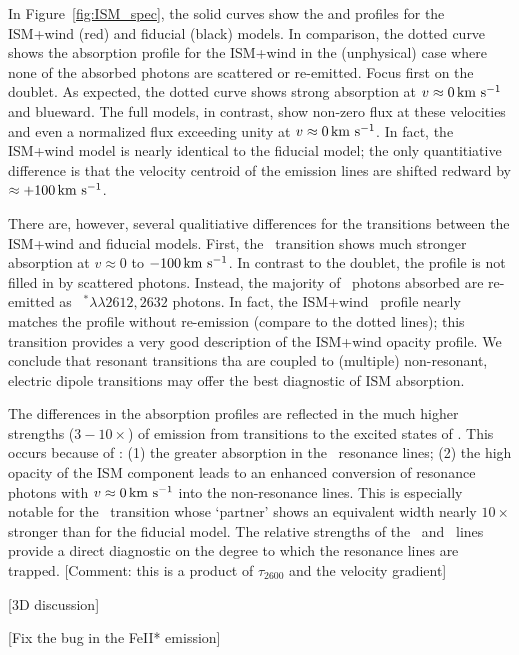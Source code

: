 \documentclass[12pt,preprint]{aastex}
\begin{document}
In Figure~\ref{fig:ISM_spec}, the solid curves show the  and
 profiles for the ISM+wind (red) and fiducial (black)
models. In comparison, the
dotted curve shows the absorption profile for the ISM+wind in the (unphysical) case
where none of the absorbed photons are scattered or re-emitted.   Focus first on the
 doublet.  As expected, the dotted curve shows strong
absorption at $v \approx 0 \, {\rm km~s^{-1}}$ and blueward.  The full models,
in contrast, show non-zero flux at these velocities and even a
normalized flux exceeding unity at $v \approx 0 \, {\rm km~s^{-1}}$.  In
fact, the ISM+wind model is nearly identical to the fiducial model;
the only quantitiative difference is that the velocity centroid of
the emission lines are shifted redward by $\approx +100 \, {\rm km~s^{-1}}$.

There are, however, several qualitiative differences 
for the  transitions between the ISM+wind and fiducial
models.
First,
the \feiia\ transition shows much stronger absorption at $v \approx 0$
to $-100 \, {\rm km~s^{-1}}$.  In contrast to the  doublet,
the profile is not filled in by scattered photons. Instead, 
the majority of \feiia\ photons absorbed are re-emitted as
~$^* \lambda\lambda 2612, 2632$ photons.  In fact, the
ISM+wind \feiia\ profile nearly matches the profile without re-emission 
(compare to the dotted lines); this transition provides a
very good description of the ISM+wind opacity profile.  
We conclude that resonant transitions tha are coupled to (multiple)
non-resonant, electric dipole transitions may offer the best
diagnostic of ISM absorption.

The differences in the  absorption profiles are reflected
in the much higher strengths ($3-10\times$) of emission from
transitions to the excited states of \aconfig.   This occurs because
of : (1) the greater absorption in the \feiid\
resonance lines; (2) the high opacity of the ISM component leads to
an enhanced conversion of resonance photons with $v \approx 0\, {\rm km~s^{-1}}$
into the non-resonance lines.  This is especially notable for the
\feiib\ transition whose `partner' shows an equivalent width nearly
$10\times$ stronger than for the fiducial model.  The relative
strengths of the \feiib\ and \feiie\ lines provide a direct
diagnostic on the degree to which the resonance lines are trapped.
[Comment:  this is a product of $\tau_{2600}$ and the velocity
gradient]

[3D discussion]

[Fix the bug in the FeII* emission]
\end{document}

